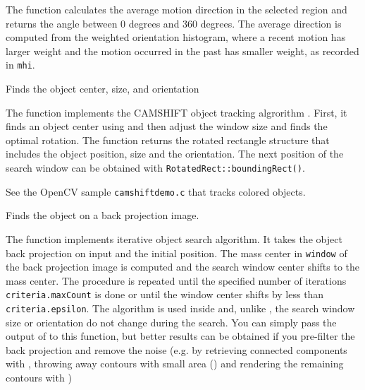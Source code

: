 The function calculates the average
motion direction in the selected region and returns the angle between
0 degrees  and 360 degrees. The average direction is computed from
the weighted orientation histogram, where a recent motion has larger
weight and the motion occurred in the past has smaller weight, as recorded in \texttt{mhi}.

Finds the object center, size, and orientation

\begin{description}
\end{description}

The function implements the CAMSHIFT object tracking algrorithm
\cite{Bradski98}.
First, it finds an object center using  and then adjust the window size and finds the optimal rotation. The function returns the rotated rectangle structure that includes the object position, size and the orientation. The next position of the search window can be obtained with \texttt{RotatedRect::boundingRect()}.

See the OpenCV sample \texttt{camshiftdemo.c} that tracks colored objects.

Finds the object on a back projection image.

\begin{description}
\end{description}

The function implements iterative object search algorithm. It takes the object back projection on input and the initial position. The mass center in \texttt{window} of the back projection image is computed and the search window center shifts to the mass center. The procedure is repeated until the specified number of iterations \texttt{criteria.maxCount} is done or until the window center shifts by less than \texttt{criteria.epsilon}. The algorithm is used inside  and, unlike , the search window size or orientation do not change during the search. You can simply pass the output of  to this function, but better results can be obtained if you pre-filter the back projection and remove the noise (e.g. by retrieving connected components with , throwing away contours with small area () and rendering the  remaining contours with )



